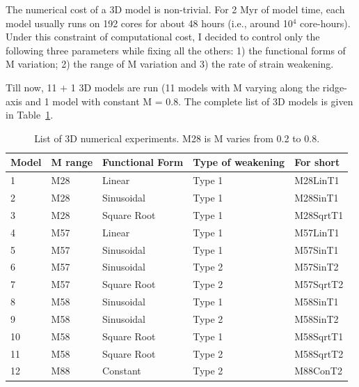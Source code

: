 The numerical cost of a 3D model is non-trivial. For 2 Myr of model time, each model usually runs on 192 cores for about 48 hours (i.e., around 10$^{4}$ core-hours). %
Under this constraint of computational cost, I decided to control only the following three parameters while fixing all the others: 1) the functional forms of M variation; 2) the range of M variation and 3) the rate of strain weakening.

Till now, 11 $+$ 1 3D models are run (11 models with M varying along the ridge-axis and 1 model with constant M = 0.8. The complete list of 3D models is given in Table~\hyperref[Tab1_1]{\ref{Tab1_1}}. 

\begin{table}[h]
\centering
\begin{tabular}{l l l l l}
\hline
\hline
Model& M range & Functional Form & Type of weakening & For short \\ 
\hline
1    &  M28    &   Linear        & Type 1   &  M28LinT1\\
\hline
2    &  M28    &   Sinusoidal    & Type 1   &  M28SinT1\\
\hline
3    &  M28    &   Square Root   & Type 1   &  M28SqrtT1 \\
\hline
4    &  M57    &   Linear        & Type 1   &  M57LinT1 \\
\hline
5    &  M57    &   Sinusoidal    & Type 1   &  M57SinT1 \\
\hline
6    &  M57    &   Sinusoidal    & Type 2   &  M57SinT2 \\
\hline
7    &  M57    &   Square Root   & Type 2   &  M57SqrtT2  \\
\hline
8    &  M58    &   Sinusoidal    & Type 1   &  M58SinT1  \\
\hline
9    &  M58    &   Sinusoidal    & Type 2   &  M58SinT2   \\
\hline
10   &  M58    &   Square Root   & Type 1   &  M58SqrtT1   \\
\hline
11   &  M58    &   Square Root   & Type 2   &  M58SqrtT2   \\
\hline
12   &  M88    &   Constant      & Type 2   &  M88ConT2 \\
\hline
\hline
\end{tabular}
\caption{List of 3D numerical experiments. M28 is M varies from 0.2 to 0.8.}
\label{Tab1_1}
\end{table}




